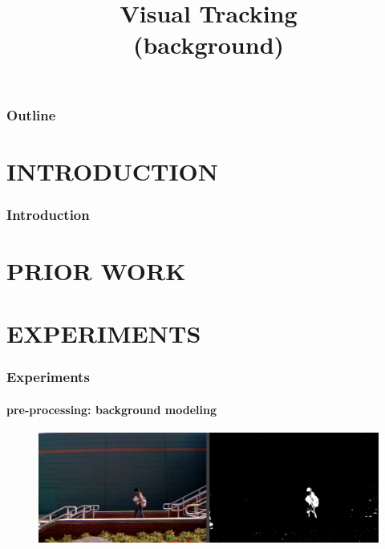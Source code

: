 
\title{Visual Tracking \\ (background)}
\begin{frame}[plain]\logoTechTower
	\titlepage
\end{frame}

\begin{frame}
\frametitle{Outline}
\logoCSIPCPL\logoTechTower
	\setcounter{tocdepth}{1}	
	\tableofcontents
\end{frame}

\section{INTRODUCTION}
\begin{frame}
\frametitle{Introduction}
\framesubtitle{}
\logoCSIPCPL\mypagenum
\end{frame}

\section{PRIOR WORK}


\section{EXPERIMENTS}
\begin{frame}
\frametitle{Experiments}
\framesubtitle{pre-processing: background modeling}
\logoCSIPCPL\mypagenum
	\begin{figure}		
		\includegraphics[width=1.0\textwidth]{figs/Proposal_fig12_TRK_multiGaussian.pdf}		
	\end{figure}
\end{frame}



\printbibliography

